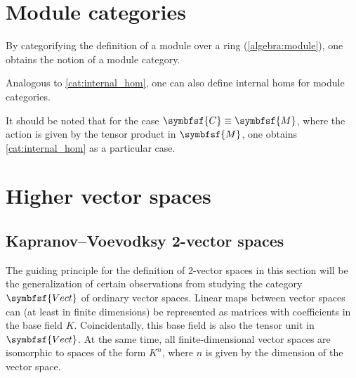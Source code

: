 \section{Module categories}

    By categorifying the definition of a module over a ring (\cref{algebra:module}), one obtains the notion of a module category.

    Analogous to \cref{cat:internal_hom}, one can also define internal homs for module categories.
    \begin{property}
        It should be noted that for the case $\symbfsf{C}\equiv\symbfsf{M}$, where the action is given by the tensor product in $\symbfsf{M}$, one obtains \cref{cat:internal_hom} as a particular case.
    \end{property}

\section{Higher vector spaces}
\subsection{Kapranov--Voevodksy 2-vector spaces}

    The guiding principle for the definition of 2-vector spaces in this section will be the generalization of certain observations from studying the category $\symbfsf{Vect}$ of ordinary vector spaces. Linear maps between vector spaces can (at least in finite dimensions) be represented as matrices with coefficients in the base field $K$. Coincidentally, this base field is also the tensor unit in $\symbfsf{Vect}$. At the same time, all finite-dimensional vector spaces are isomorphic to spaces of the form $K^n$, where $n$ is given by the dimension of the vector space.

